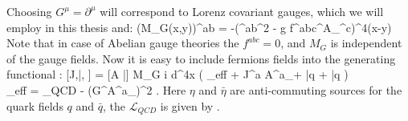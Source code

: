 	\eeqa
	Choosing $G^\mu = \partial^\mu$ will correspond to Lorenz covariant gauges, which we will employ in this thesis and: 
	\beqa
		\label{qcd_low:Gauge_matrix}
		(M_G(x,y))^{ab} = -(\delta^{ab}\partial^2 - g f^{abc}\partial^\mu A_\mu^c)\delta^4(x-y)
	\eeqa
	Note that in case of Abelian gauge theories the $f^{abc}=0$, and $M_G$ is independent of the gauge fields. Now it is easy to include fermions fields into the generating functional \Eq{\ref{qcd_low:Gen_functional_vec_2}}:
	\beqa
		\label{qcd_low:Gen_functional_vec_fer}
		[J,\bar \eta, \eta] = \int {} [A \bar \eta \eta] \;  M_G \;   \left\lbrace i \int d^4x \left( _{eff} + J^{a\mu} A^a_\mu + \bar q \eta + \bar \eta q \right)  \right\rbrace \;\; \\
		_{eff} = _{QCD} - (G^\mu A^a_\mu)^2 \;. \;\;\;\;\;\;\;\;\;\;\;\;\;\;\;\;\;\;\;\;\;\;\;\;\;\;\;\;\;\;\;\;\;\;\;\;
	\eeqa
	Here $\eta$ and $\bar \eta$ are anti-commuting sources for the quark fields $q$ and $\bar q$, the $\mathcal{L}_{QCD}$ is given by \Eq{\ref{qcd_low:L_QCD}}. \\
	
